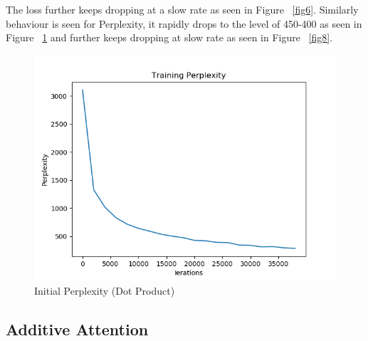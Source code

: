 \documentclass[11pt,a4paper]{article}
\begin{document}
The loss further keeps dropping at a slow rate as seen in Figure ~\ref{fig6}. Similarly behaviour is seen for Perplexity, it rapidly drops to the level of 450-400 as seen in Figure ~\ref{fig7} and further keeps dropping at slow rate as seen in Figure ~\ref{fig8}.



\begin{figure}[!htbp]
\includegraphics[width=\linewidth]{hi_dot_ppl_1.png}
\caption{Initial Perplexity (Dot Product)}
\label{fig7}
\end{figure}



\subsection{Additive Attention}
\end{document}
